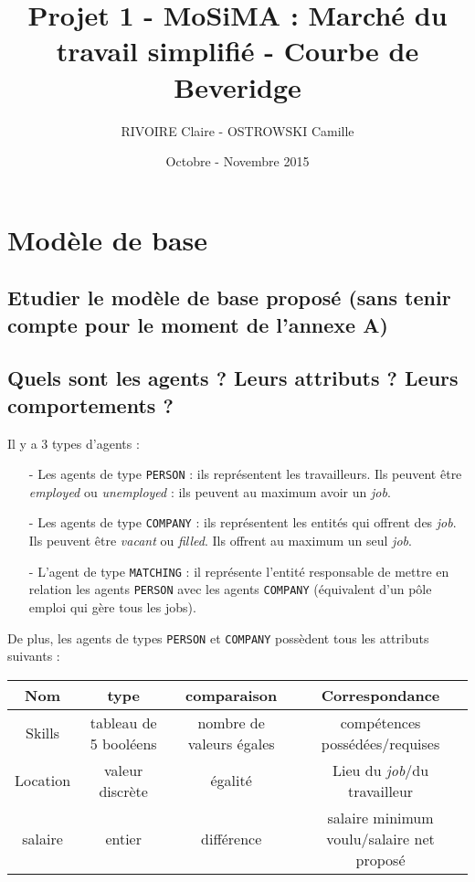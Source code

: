 \documentclass[10pt,a4paper]{article}
\begin{document}
    \title{Projet 1 - MoSiMA : Marché du travail simplifié - Courbe de Beveridge}
    \author{RIVOIRE Claire - OSTROWSKI Camille}
    \date{Octobre - Novembre 2015} %
    
    \maketitle
    \section{Modèle de base}
    \subsection{Etudier le modèle de base proposé (sans tenir compte pour le moment de l'annexe A)}
    \subsection{Quels sont les agents ? Leurs attributs ? Leurs comportements ?}
    
    Il y a 3 types d'agents :
    \begin{itemize}
    \item [-] Les agents de type \texttt{PERSON} : ils représentent les travailleurs. Ils peuvent être \emph{employed} ou \emph{unemployed} : ils peuvent au maximum avoir un \emph{job}.
    \item [-] Les agents de type \texttt{COMPANY} : ils représentent les entités qui offrent des \emph{job}. Ils peuvent être \emph{vacant} ou \emph{filled}. Ils offrent au maximum un seul \emph{job}.
    \item [-] L'agent de type \texttt{MATCHING} : il représente l'entité responsable de mettre en relation les agents \texttt{PERSON} avec les agents \texttt{COMPANY} (équivalent d'un pôle emploi qui gère tous les jobs).
    \end{itemize}
    
    De plus, les agents de types \texttt{PERSON} et \texttt{COMPANY} possèdent tous les attributs suivants :
    \begin{center}
    \begin{tabular}{|c|c|c|c|}
    \hline Nom & type &  comparaison &  Correspondance  \\
    \hline Skills & tableau de 5 booléens & nombre de valeurs égales & compétences possédées/requises \\
    \hline Location & valeur discrète & égalité & Lieu du \emph{job}/du travailleur \\
    \hline salaire & entier & différence & salaire minimum voulu/salaire net proposé \\
    \hline
    \end{tabular}
    \end{center}
    
\end{document}
